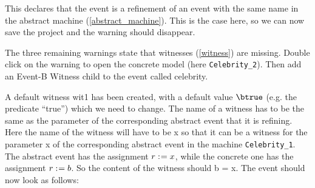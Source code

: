 
 This declares that the event is a refinement of an event with the same name in the abstract machine (\ref{abstract_machine}). This is the case here, so we can now save the project and the warning should disappear.


The three remaining warnings state that witnesses (\ref{witness}) are missing. Double click on the warning to open the concrete model (here \texttt{Celebrity\_2}). Then add an \textsf{Event-B Witness} child to the event called \textsf{celebrity}.

A default witness \textsf{wit1} has been created, with a default value \textsf{$\btrue$} (e.g. the predicate ``true'') which we need to change. The name of a witness has to be the same as the parameter of the corresponding abstract event that it is refining. Here the name of the witness will have to be \textsf{x} so that it can be a witness for the parameter \textsf{x} of the corresponding abstract event in the machine \texttt{Celebrity\_1}. The abstract event has the assignment \textsf{$r \mathrel{:\mkern1mu=} x$}, while the concrete one has the assignment \textsf{$r \mathrel{:\mkern1mu=} b$}. So the content of the witness should \textsf{b = x}. The event should now look as follows: 


